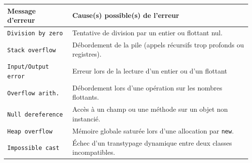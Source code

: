 \begin{table}[H]
\centering
\begin{tabularx}{\textwidth}{|l|X|}
\hline
\rowcolor{gray!10} Message d'erreur & Cause(s) possible(s) de l'erreur \\
\hline
\texttt{Division by zero} & Tentative de division par un entier ou flottant nul. \\
\hline
\texttt{Stack overflow} & Débordement de la pile (appels récursifs trop profonds ou registres). \\
\hline
\texttt{Input/Output error} & Erreur lors de la lecture d'un entier ou d'un flottant \\
\hline
\texttt{Overflow arith.} & Débordement lors d'une opération sur les nombres flottants. \\
\hline
\texttt{Null dereference} & Accès à un champ ou une méthode sur un objet non instancié. \\
\hline
\texttt{Heap overflow} & Mémoire globale saturée lors d'une allocation par \texttt{new}. \\
\hline
\texttt{Impossible cast} & Échec d'un transtypage dynamique entre deux classes incompatibles. \\
\hline
\end{tabularx}
\end{table}